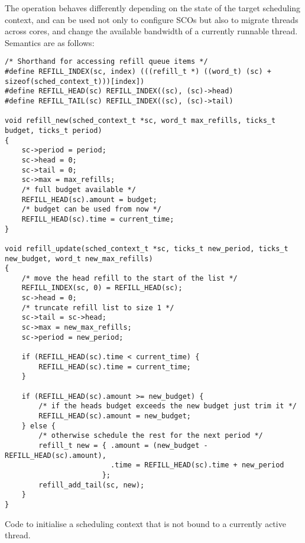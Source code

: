 The \schedcontrolconfigure operation behaves differently depending on the state of the target scheduling
context, and can be used not only to configure \glspl{SCO} but also to migrate threads across cores, and
change the available bandwidth of a currently runnable thread. Semantics are as follows:

\begin{listing}[t]
\begin{verbatim}
/* Shorthand for accessing refill queue items */
#define REFILL_INDEX(sc, index) (((refill_t *) ((word_t) (sc) + sizeof(sched_context_t)))[index])
#define REFILL_HEAD(sc) REFILL_INDEX((sc), (sc)->head)
#define REFILL_TAIL(sc) REFILL_INDEX((sc), (sc)->tail)

void refill_new(sched_context_t *sc, word_t max_refills, ticks_t budget, ticks_t period)
{
    sc->period = period;
    sc->head = 0;
    sc->tail = 0;
    sc->max = max_refills;
    /* full budget available */
    REFILL_HEAD(sc).amount = budget;
    /* budget can be used from now */
    REFILL_HEAD(sc).time = current_time;
}

void refill_update(sched_context_t *sc, ticks_t new_period, ticks_t new_budget, word_t new_max_refills)
{
    /* move the head refill to the start of the list */
    REFILL_INDEX(sc, 0) = REFILL_HEAD(sc);
    sc->head = 0;
    /* truncate refill list to size 1 */
    sc->tail = sc->head;
    sc->max = new_max_refills;
    sc->period = new_period;

    if (REFILL_HEAD(sc).time < current_time) {
        REFILL_HEAD(sc).time = current_time;
    }

    if (REFILL_HEAD(sc).amount >= new_budget) {
        /* if the heads budget exceeds the new budget just trim it */
        REFILL_HEAD(sc).amount = new_budget;
    } else {
        /* otherwise schedule the rest for the next period */
        refill_t new = { .amount = (new_budget - REFILL_HEAD(sc).amount),
                         .time = REFILL_HEAD(sc).time + new_period
                       };
        refill_add_tail(sc, new);
    }
}
\end{verbatim}
\caption[Refill update routine.]{Code to initialise a scheduling context that is not bound to a currently active thread.}
\label{list:refill-init}
\end{listing}


